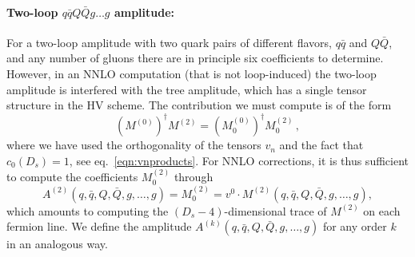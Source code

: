 \paragraph{Two-loop $q\bar qQ\bar Qg\ldots g$ amplitude:}
For a
two-loop amplitude with two quark pairs of 
different flavors, $q\bar q$ and $Q\bar Q$, and any number of
gluons there are in principle six coefficients to determine. 
However, in an NNLO computation (that is not loop-induced) 
the two-loop amplitude is 
interfered with the tree amplitude, which has a single tensor
structure in the HV scheme. The contribution we must compute is of the form
\begin{equation}\label{eq:qqQQProj}
  \left(M^{(0)}\right)^\dagger M^{(2)}=
  \left(M^{(0)}_0\right)^\dagger M^{(2)}_0\,,
\end{equation}
where we have used the orthogonality of the tensors
$v_n$ and the fact that $c_0(D_s)=1$, see 
eq.~\eqref{eqn:vnproducts}. 
For NNLO corrections, it is
thus sufficient to compute the coefficients
$M^{(2)}_0$ through
\begin{equation}
  \label{eq:AmplitudeDefinition}
  A^{(2)}(q,\bar q,Q,\bar Q,g,\ldots,g)=
  M^{(2)}_0 = v^0 \cdot 
  M^{(2)}(q,\bar q,Q,\bar Q,g,\ldots,g),
\end{equation}
which amounts to computing the 
$(D_s-4)$-dimensional trace of $M^{(2)}$ on
each fermion line.  
We define the amplitude
$A^{(k)}(q,\bar q,Q,\bar Q,g,\ldots,g)$ for any order $k$
in an analogous way.

